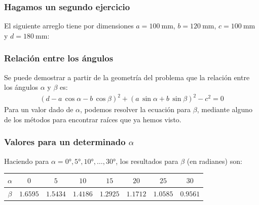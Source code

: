 \documentclass[12pt]{beamer}
\begin{document}
\begin{frame}
\frametitle{Hagamos un segundo ejercicio}
El siguiente arreglo tiene por dimensiones $a = \SI{100}{\milli\meter}$,  $b = \SI{120}{\milli\meter}$, $c = \SI{100}{\milli\meter}$ y $d = \SI{180}{\milli\meter}$:
\begin{center}
\end{center}
\end{frame}
\begin{frame}
\frametitle{Relación entre los ángulos}
Se puede demostrar a partir de la geometría del problema que la relación entre los ángulos $\alpha$ y $\beta$ es:
\pause
\begin{align*}
(d - a \, \cos \alpha - b \, \cos \beta)^{2} + (a \, \sin \alpha + b \, \sin \beta)^{2} - c^{2} = 0
\end{align*}
\pause
Para un valor dado de $\alpha$, podemos resolver la ecuación para $\beta$, mediante alguno de los métodos para encontrar raíces que ya hemos visto.
\end{frame}
\begin{frame}
\frametitle{Valores para un determinado $\alpha$}
Haciendo para $\alpha = \ang{0}, \ang{5}, \ang{10},\ldots, \ang{30}$, los resultados para $\beta$ (en radianes) son:
\pause
\\[1em]
\begin{table}
\centering
\fontsize{10}{10}\selectfont
\begin{tabular}{c | c | c | c | c | c | c | c}
$\alpha$ & $0$ & $5$ & $10$ & $15$ & $20$ & $25$ & $30$  \\ \hline
$\beta$ & $1.6595$ & $1.5434$ & $1.4186$ & $1.2925$ & $1.1712$ & $1.0585$ & $0.9561$
\end{tabular}
\end{table}
\end{frame}
\end{document}
